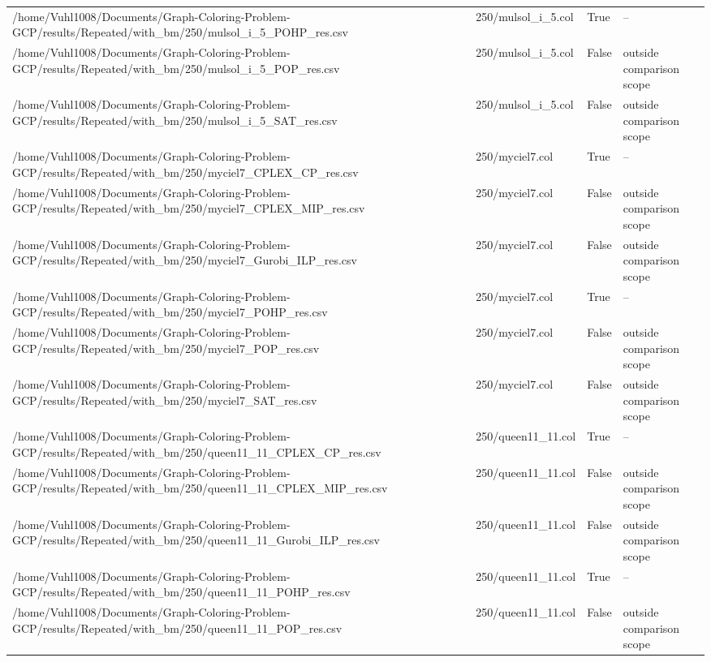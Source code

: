 \begin{table}[htbp]
\begin{tabular}{llll}
/home/Vuhl1008/Documents/Graph-Coloring-Problem-GCP/results/Repeated/with\_bm/250/mulsol\_i\_5\_POHP\_res.csv & 250/mulsol\_i\_5.col & True & -- \\
/home/Vuhl1008/Documents/Graph-Coloring-Problem-GCP/results/Repeated/with\_bm/250/mulsol\_i\_5\_POP\_res.csv & 250/mulsol\_i\_5.col & False & outside comparison scope \\
/home/Vuhl1008/Documents/Graph-Coloring-Problem-GCP/results/Repeated/with\_bm/250/mulsol\_i\_5\_SAT\_res.csv & 250/mulsol\_i\_5.col & False & outside comparison scope \\
/home/Vuhl1008/Documents/Graph-Coloring-Problem-GCP/results/Repeated/with\_bm/250/myciel7\_CPLEX\_CP\_res.csv & 250/myciel7.col & True & -- \\
/home/Vuhl1008/Documents/Graph-Coloring-Problem-GCP/results/Repeated/with\_bm/250/myciel7\_CPLEX\_MIP\_res.csv & 250/myciel7.col & False & outside comparison scope \\
/home/Vuhl1008/Documents/Graph-Coloring-Problem-GCP/results/Repeated/with\_bm/250/myciel7\_Gurobi\_ILP\_res.csv & 250/myciel7.col & False & outside comparison scope \\
/home/Vuhl1008/Documents/Graph-Coloring-Problem-GCP/results/Repeated/with\_bm/250/myciel7\_POHP\_res.csv & 250/myciel7.col & True & -- \\
/home/Vuhl1008/Documents/Graph-Coloring-Problem-GCP/results/Repeated/with\_bm/250/myciel7\_POP\_res.csv & 250/myciel7.col & False & outside comparison scope \\
/home/Vuhl1008/Documents/Graph-Coloring-Problem-GCP/results/Repeated/with\_bm/250/myciel7\_SAT\_res.csv & 250/myciel7.col & False & outside comparison scope \\
/home/Vuhl1008/Documents/Graph-Coloring-Problem-GCP/results/Repeated/with\_bm/250/queen11\_11\_CPLEX\_CP\_res.csv & 250/queen11\_11.col & True & -- \\
/home/Vuhl1008/Documents/Graph-Coloring-Problem-GCP/results/Repeated/with\_bm/250/queen11\_11\_CPLEX\_MIP\_res.csv & 250/queen11\_11.col & False & outside comparison scope \\
/home/Vuhl1008/Documents/Graph-Coloring-Problem-GCP/results/Repeated/with\_bm/250/queen11\_11\_Gurobi\_ILP\_res.csv & 250/queen11\_11.col & False & outside comparison scope \\
/home/Vuhl1008/Documents/Graph-Coloring-Problem-GCP/results/Repeated/with\_bm/250/queen11\_11\_POHP\_res.csv & 250/queen11\_11.col & True & -- \\
/home/Vuhl1008/Documents/Graph-Coloring-Problem-GCP/results/Repeated/with\_bm/250/queen11\_11\_POP\_res.csv & 250/queen11\_11.col & False & outside comparison scope \\

\end{tabular}
\end{table}
